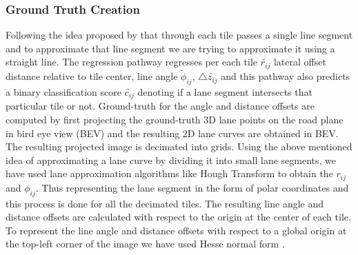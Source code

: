         \subsubsection{Ground Truth Creation}
        Following the idea proposed by \cite{DBLP:journals/corr/abs-2011-01535} that through each tile passes a single line segment and to approximate that line segment we are trying to approximate it using a straight line. The regression pathway regresses per each tile $\widetilde{r_{ij}}$ lateral offset distance relative to tile center, line angle $\widetilde{\phi}_{ij}$, $\triangle{\widetilde{z_{ij}}}$ and this pathway also predicts a binary classification score $\widetilde{c_{ij}}$ denoting if a lane segment intersects that particular tile or not. 
        Ground-truth for the angle and distance offsets are computed by first projecting the ground-truth 3D lane points on the road plane in bird eye view (BEV) and the resulting 2D lane curves are obtained in BEV. The resulting projected image is decimated into grids. Using the above mentioned idea of approximating a lane curve by dividing it into small lane segments, we have used lane approximation algorithms like Hough Transform to obtain the $r_{ij}$ and $\phi_{ij}$. Thus representing the lane segment in the form of polar coordinates and this process is done for all the decimated tiles. The resulting line angle and distance offsets are calculated with respect to the origin at the center of each tile. To represent the line angle and distance offsets with respect to a global origin at the top-left corner of the image we have used Hesse normal form . 
        
